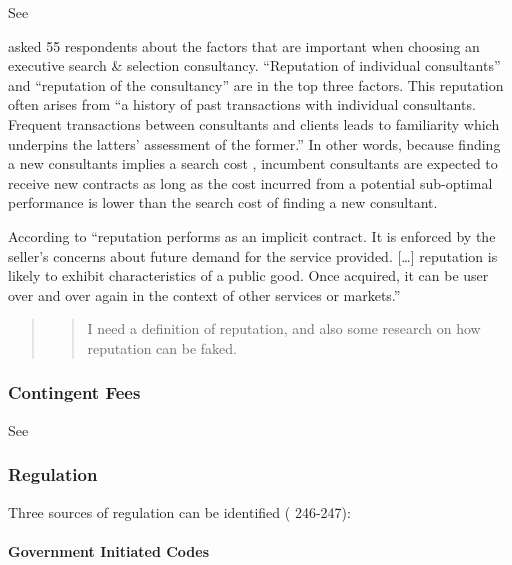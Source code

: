 \documentclass[12pt]{article}
\begin{document}
See \citep[ 76]{armbruster2006}

\citet[243-244]{clark1993} asked 55 respondents about the factors that
are important when choosing an executive search \& selection
consultancy. ``Reputation of individual consultants'' and ``reputation
of the consultancy'' are in the top three factors. This reputation often
arises from ``a history of past transactions with individual
consultants. Frequent transactions between consultants and clients leads
to familiarity which underpins the latters' assessment of the former.''
In other words, because finding a new consultants implies a search cost
\citep[ 1072]{wilson2012}, incumbent consultants are expected to receive
new contracts as long as the cost incurred from a potential sub-optimal
performance is lower than the search cost of finding a new consultant.

According to \citet[516]{nayyar1990} ``reputation performs as an
implicit contract. It is enforced by the seller's concerns about future
demand for the service provided. {[}\ldots{]} reputation is likely to
exhibit characteristics of a public good. Once acquired, it can be user
over and over again in the context of other services or markets.''

\begin{quote}
\begin{quote}
I need a definition of reputation, and also some research on how
reputation can be faked.
\end{quote}
\end{quote}

\hypertarget{contingent-fees}{%
\subsubsection{Contingent Fees}\label{contingent-fees}}

See \citep[ 243]{clark1993}

\hypertarget{regulation}{%
\subsubsection{Regulation}\label{regulation}}

Three sources of regulation can be identified (\citet{clark1993}
246-247):

\hypertarget{government-initiated-codes}{%
\paragraph{Government Initiated
Codes}\label{government-initiated-codes}}
\end{document}
